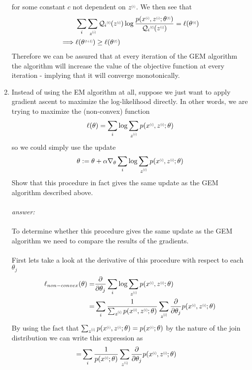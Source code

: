 \documentclass{article}
\newcommand{\supx}[1]{\scalebox{0.6}[0.75]{$^{(#1)}$}}
\newcommand{\supi}{\scalebox{0.6}[0.75]{$^{(i)}$}}
\begin{document}
\begin{enumerate}[label=(\alph*)]
    for some constant $c$ not dependent on $z\supi$. We then see that
    \begin{align*} &{}\sum_i\sum_{z\supi}\mathcal{Q}_i\supx{t}(z\supi)\log\frac{p(x\supi,z\supi;\theta\supx{t})}{\mathcal{Q}_i\supx{t}(z\supi)} = \ell(\theta\supx{t})\\
    \implies&{} \ell(\theta\supx{t+1}) \geq \ell(\theta\supx{t})
    \end{align*}
    Therefore we can be assured that at every iteration of the GEM algorithm the algorithm will increase the value of the objective function at every iteration - implying that it will converge monotonically.
    \item Instead of using the EM algorithm at all, suppose we just want to apply gradient ascent to maximize the log-likelihood directly. In other words, we are trying to maximize the (non-convex) function
    \begin{align*}
        \ell(\theta) = \sum_i\log\sum_{z\supi}p(x\supi,z\supi;\theta)
    \end{align*}
    so we could simply use the update
    \begin{align*}
        \theta := \theta + \alpha\nabla_\theta\sum_i\log\sum_{z\supi} p(x\supi,z\supi;\theta)
    \end{align*}
    Show that this procedure in fact gives the same update as the GEM algorithm described above.\\\\
    \textit{answer:}\\\\
    To determine whether this procedure gives the same update as the GEM algorithm we need to compare the results of the gradients.\\\\
    First lets take a look at the derivative of this procedure with respect to each $\theta_j$
    \begin{align*}
        \ell_{non-convex}(\theta) =&{} \frac{\partial}{\partial\theta_j} \sum_i\log\sum_{z\supi}p(x\supi,z\supi;\theta)\\
        =&{} \sum_i\frac{1}{\sum_{z\supi}p(x\supi,z\supi;\theta)}\sum_{z\supi}\frac{\partial}{\partial\theta_j}p(x\supi,z\supi;\theta)
    \end{align*}
    By using the fact that $\sum_{z\supi}p(x\supi,z\supi;\theta) = p(x\supi;\theta)$ by the nature of the join distribution we can write this expression as
    \begin{align*}
        =&{} \sum_i\frac{1}{p(x\supi;\theta)}\sum_{z\supi}\frac{\partial}{\partial\theta_j}p(x\supi,z\supi;\theta)

\end{align*}
\end{enumerate}
\end{document}
